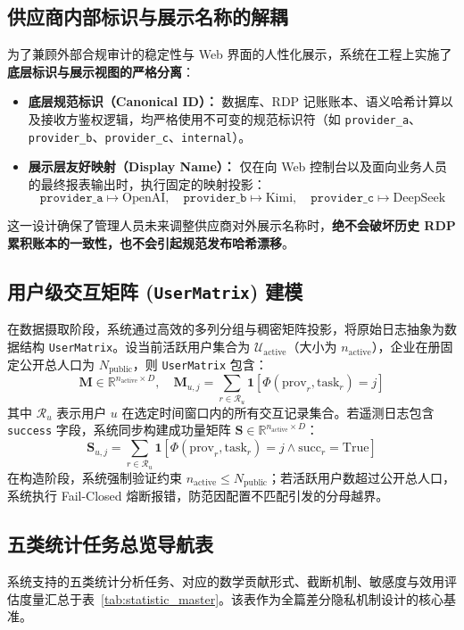 \subsection{供应商内部标识与展示名称的解耦}
为了兼顾外部合规审计的稳定性与 Web 界面的人性化展示，系统在工程上实施了\textbf{底层标识与展示视图的严格分离}：
\begin{itemize}[leftmargin=2em]
  \item \textbf{底层规范标识（Canonical ID）：} 数据库、RDP 记账账本、语义哈希计算以及接收方鉴权逻辑，均严格使用不可变的规范标识符（如 \texttt{provider\_a}、\texttt{provider\_b}、\texttt{provider\_c}、\texttt{internal}）。
  \item \textbf{展示层友好映射（Display Name）：} 仅在向 Web 控制台以及面向业务人员的最终报表输出时，执行固定的映射投影：
    $$\texttt{provider\_a} \mapsto \text{OpenAI}, \quad \texttt{provider\_b} \mapsto \text{Kimi}, \quad \texttt{provider\_c} \mapsto \text{DeepSeek}$$
\end{itemize}
这一设计确保了管理人员未来调整供应商对外展示名称时，\textbf{绝不会破坏历史 RDP 累积账本的一致性，也不会引起规范发布哈希漂移}。

\subsection{用户级交互矩阵 (\texttt{UserMatrix}) 建模}
在数据摄取阶段，系统通过高效的多列分组与稠密矩阵投影，将原始日志抽象为数据结构 \texttt{UserMatrix}。设当前活跃用户集合为 $\mathcal{U}_{\text{active}}$（大小为 $n_{\text{active}}$），企业在册固定公开总人口为 $N_{\text{public}}$，则 \texttt{UserMatrix} 包含：
\begin{equation}
  \mathbf{M} \in \mathbb{R}^{n_{\text{active}} \times D}, \quad \mathbf{M}_{u, j} = \sum_{r \in \mathcal{R}_u} \mathbf{1}[\Phi(\text{prov}_r, \text{task}_r) = j]
\end{equation}
其中 $\mathcal{R}_u$ 表示用户 $u$ 在选定时间窗口内的所有交互记录集合。若遥测日志包含 \texttt{success} 字段，系统同步构建成功量矩阵 $\mathbf{S} \in \mathbb{R}^{n_{\text{active}} \times D}$：
\begin{equation}
  \mathbf{S}_{u, j} = \sum_{r \in \mathcal{R}_u} \mathbf{1}[\Phi(\text{prov}_r, \text{task}_r) = j \land \text{succ}_r = \text{True}]
\end{equation}
在构造阶段，系统强制验证约束 $n_{\text{active}} \le N_{\text{public}}$；若活跃用户数超过公开总人口，系统执行 Fail-Closed 熔断报错，防范因配置不匹配引发的分母越界。

\subsection{五类统计任务总览导航表}
系统支持的五类统计分析任务、对应的数学贡献形式、截断机制、敏感度与效用评估度量汇总于表~\ref{tab:statistic_master}。该表作为全篇差分隐私机制设计的核心基准。

